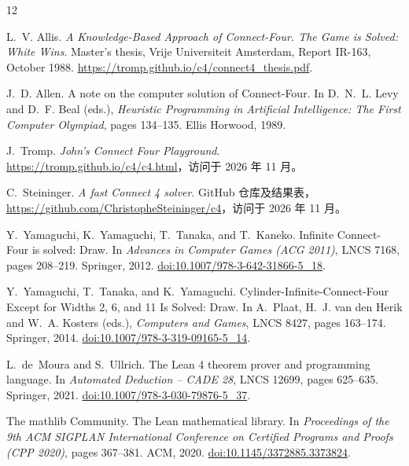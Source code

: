 \documentclass[11pt,a4paper]{article}
\theoremstyle{zhthm}
\begin{document}
\begin{thebibliography}{12}
\small\raggedright
\setlength{\itemsep}{3pt}

{\latinrm
L.~V. Allis.
\newblock \emph{A Knowledge-Based Approach of Connect-Four. The Game is Solved: White Wins}.
\newblock Master's thesis, Vrije Universiteit Amsterdam, Report IR-163, October 1988.
\newblock \url{https://tromp.github.io/c4/connect4_thesis.pdf}.}

{\latinrm J.~D. Allen.
\newblock A note on the computer solution of Connect-Four.
\newblock In D.~N.~L. Levy and D.~F. Beal (eds.), \emph{Heuristic Programming in Artificial Intelligence: The First Computer Olympiad}, pages 134--135. Ellis Horwood, 1989.}

{\latinrm J.~Tromp.
\newblock \emph{John's Connect Four Playground}.}
\newblock \url{https://tromp.github.io/c4/c4.html}，访问于 2026 年 11 月。

{\latinrm C.~Steininger.
\newblock \emph{A fast Connect 4 solver}.}
\newblock GitHub 仓库及结果表，\url{https://github.com/ChristopheSteininger/c4}，访问于 2026 年 11 月。

{\latinrm
Y.~Yamaguchi, K.~Yamaguchi, T.~Tanaka, and T.~Kaneko.
\newblock Infinite Connect-Four is solved: Draw.
\newblock In \emph{Advances in Computer Games (ACG 2011)}, LNCS 7168, pages 208--219. Springer, 2012.
\newblock \href{https://doi.org/10.1007/978-3-642-31866-5_18}{doi:10.1007/978-3-642-31866-5\_18}.}

{\latinrm
Y.~Yamaguchi, T.~Tanaka, and K.~Yamaguchi.
\newblock Cylinder-Infinite-Connect-Four Except for Widths 2, 6, and 11 Is Solved: Draw.
\newblock In A.~Plaat, H.~J. van den Herik and W.~A. Kosters (eds.), \emph{Computers and Games}, LNCS 8427, pages 163--174. Springer, 2014.
\newblock \href{https://doi.org/10.1007/978-3-319-09165-5_14}{doi:10.1007/978-3-319-09165-5\_14}.}

{\latinrm
L.~de~Moura and S.~Ullrich.
\newblock The Lean 4 theorem prover and programming language.
\newblock In \emph{Automated Deduction -- CADE 28}, LNCS 12699, pages 625--635. Springer, 2021.
\newblock \href{https://doi.org/10.1007/978-3-030-79876-5_37}{doi:10.1007/978-3-030-79876-5\_37}.}

{\latinrm
The mathlib Community.
\newblock The Lean mathematical library.
\newblock In \emph{Proceedings of the 9th ACM SIGPLAN International Conference on Certified Programs and Proofs (CPP 2020)}, pages 367--381. ACM, 2020.
\newblock \href{https://doi.org/10.1145/3372885.3373824}{doi:10.1145/3372885.3373824}.}


\end{thebibliography}
\end{document}
